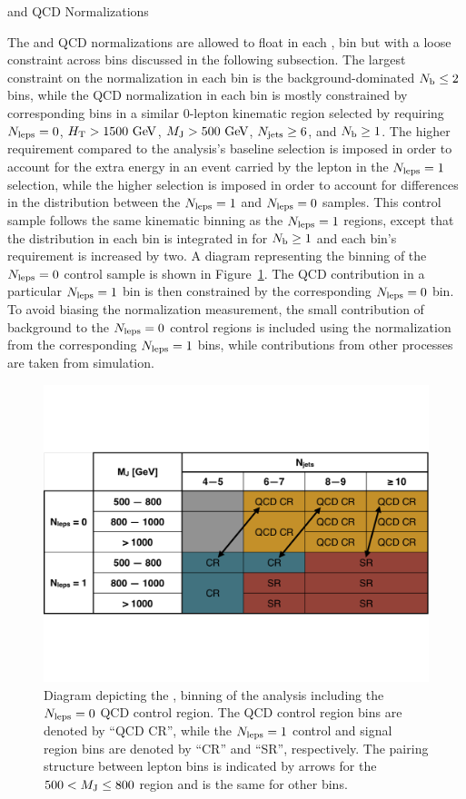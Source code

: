 \begin{section}{\ttbar and QCD Normalizations}

The \ttbar and QCD normalizations are allowed to float in each \Njets, \MJ bin but with a loose constraint across \MJ bins discussed in the following subsection.
The largest constraint on the \ttbar normalization in each bin is the background-dominated $N_{\mathrm{b}} \leq 2$ bins, while the QCD normalization in each bin is mostly constrained by corresponding bins in a similar 0-lepton kinematic region selected by requiring $N_{\mathrm{leps}} = 0$, $H_{\mathrm{T}} > 1500~\mathrm{Ge\kern -0.1em V}$, $M_{\mathrm{J}} > 500~\mathrm{Ge\kern -0.1em V}$, $N_{\mathrm{jets}} \geq 6$, and $N_{\mathrm{b}} \geq 1$.
The higher \HT requirement compared to the analysis's baseline selection is imposed in order to account for the extra energy in an event carried by the lepton in the $N_{\mathrm{leps}} = 1$ selection, while the higher \Njets selection is imposed in order to account for differences in the \Njets distribution between the $N_{\mathrm{leps}} = 1$ and $N_{\mathrm{leps}} = 0$ samples.
This control sample follows the same kinematic binning as the $N_{\mathrm{leps}} = 1$ regions, except that the \Nb distribution in each bin is integrated in \Nb for $N_{\mathrm{b}} \geq 1$ and each bin's \Njets requirement is increased by two.
A diagram representing the binning of the $N_{\mathrm{leps}} = 0$ control sample is shown in Figure~\ref{fig:nlep0_regions}.
The QCD contribution in a particular $N_{\mathrm{leps}} = 1$ bin is then constrained by the corresponding $N_{\mathrm{leps}} = 0$ bin.
To avoid biasing the normalization measurement, the small contribution of \ttbar background to the $N_{\mathrm{leps}} = 0$ control regions is included using the normalization from the corresponding $N_{\mathrm{leps}} = 1$ bins, while contributions from other processes are taken from simulation.

\begin{figure}[tbp!]
\centering
\includegraphics[angle=0,width=0.80\columnwidth]{fig/binning_nlep0.pdf}
\caption{Diagram depicting the \Njets, \MJ binning of the analysis including the $N_{\mathrm{leps}} = 0$ QCD control region.
The QCD control region bins are denoted by ``QCD CR'', while the $N_{\mathrm{leps}} = 1$ control and signal region bins are denoted by ``CR'' and ``SR'', respectively.
The pairing structure between lepton bins is indicated by arrows for the $500 < M_{\mathrm{J}} \leq 800$ region and is the same for other \MJ bins.}
\label{fig:nlep0_regions}
\end{figure}


\end{section}
